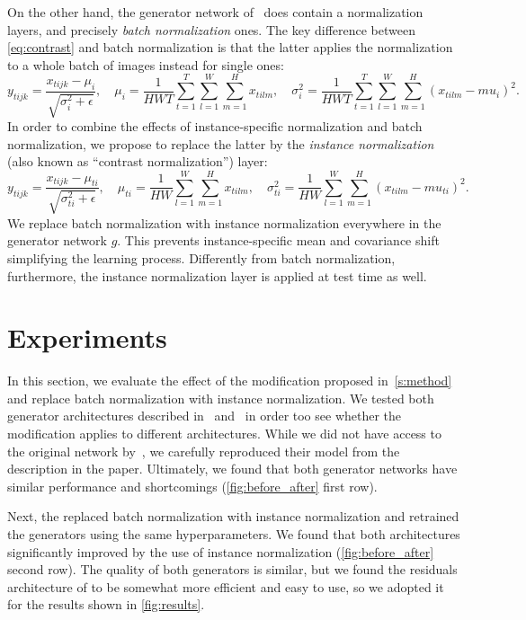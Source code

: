 \documentclass{article}
\begin{document}
On the other hand, the generator network of~\cite{DBLP:conf/icml/UlyanovLVL16} does contain a normalization layers, and precisely \emph{batch normalization} ones. The key difference between \cref{eq:contrast} and batch normalization is that the latter applies the normalization to a  whole batch of images instead for single ones:
\begin{equation}\label{eq:bnorm}
    y_{tijk} =  \frac{x_{tijk} - \mu_{i}}{\sqrt{\sigma_i^2 + \epsilon}},
    \quad
    \mu_i = \frac{1}{HWT}\sum_{t=1}^T\sum_{l=1}^W \sum_{m=1}^H x_{tilm},
    \quad
    \sigma_i^2 = \frac{1}{HWT}\sum_{t=1}^T\sum_{l=1}^W \sum_{m=1}^H (x_{tilm} - mu_i)^2.
\end{equation}
In order to combine the effects of instance-specific normalization and batch normalization, we propose to replace the latter by the \emph{instance normalization} (also known as ``contrast normalization'') layer:
\begin{equation}\label{eq:inorm}
    y_{tijk} =  \frac{x_{tijk} - \mu_{ti}}{\sqrt{\sigma_{ti}^2 + \epsilon}},
    \quad
    \mu_{ti} = \frac{1}{HW}\sum_{l=1}^W \sum_{m=1}^H x_{tilm},
    \quad
    \sigma_{ti}^2 = \frac{1}{HW}\sum_{l=1}^W \sum_{m=1}^H (x_{tilm} - mu_{ti})^2.
\end{equation}
We replace batch normalization with instance normalization everywhere in  the generator network $g$. This prevents instance-specific mean and covariance shift simplifying the learning process. Differently from batch normalization, furthermore, the instance normalization layer is applied at test time as well. 

\section{Experiments}\label{s:experiments}

In this section, we evaluate the effect of the modification proposed in~\cref{s:method} and replace batch normalization with instance normalization. We tested both generator architectures described in~\cite{DBLP:conf/icml/UlyanovLVL16} and~\cite{DBLP:journals/corr/JohnsonAL16} in order too see whether the modification applies to different architectures. While we did not have access to the original network by~\cite{DBLP:journals/corr/JohnsonAL16}, we carefully reproduced their model from the description in the paper. Ultimately, we found that both generator networks have similar performance and shortcomings (\cref{fig:before_after} first row).

Next, the replaced batch normalization with instance normalization and retrained the generators using the same hyperparameters. We found that both architectures significantly improved by the use of instance normalization (\cref{fig:before_after} second row). The quality of both generators is similar, but we found the residuals architecture of \cite{DBLP:journals/corr/JohnsonAL16} to be somewhat more efficient and easy to use, so we adopted it for the results shown in \cref{fig:results}.   
\end{document}
